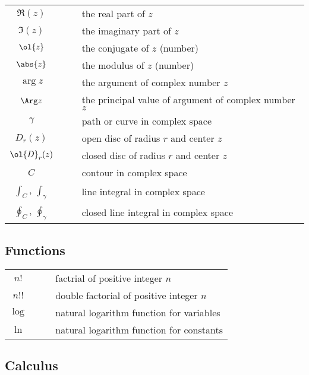\begin{center}
\begin{longtable}{ccl}
\hline
 $\Re(z)$ & &  the real part of $z$ \\
$\Im(z)$ & & the imaginary part of $z$ \\
$\ol{z}$ & & the conjugate of $z$ (number)\\
$\abs{z}$ & & the modulus of $z$ (number)\\
$\arg z$ & & the argument of complex number $z$ \\
$\Arg z$ & & the principal value of argument of complex number $z$ \\
$\gamma$ & $\quad$ & path or curve in complex space\\
$D_r(z)$ & $\quad$ & open disc of radius $r$ and center $z$ \\
$\ol{D}_r(z)$ & $\quad$ & closed disc of radius $r$ and center $z$ \\
$C$ & $\quad$ & contour in complex space\\
$\int_C$, $\int_{\gamma}$ & $\quad$ & line integral in complex space\\
$\oint_C$, $\oint_{\gamma}$ & $\quad$ & closed line integral in complex space\\
\hline
\end{longtable}
\end{center}

\subsection{Functions}


\begin{center}
\begin{longtable}{ccl}
\hline
$n!$ & & factrial of positive integer $n$ \\
$n!!$ & & double factorial of positive integer $n$ \\
$\log$ & $\quad$ & natural logarithm function for variables \\
$\ln$ & & natural logarithm function for constants \\
\hline
\end{longtable}
\end{center}



\subsection{Calculus}

